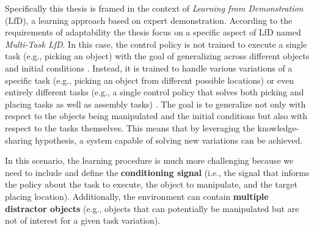 Specifically this thesis is framed in the context of \textit{Learning from Demonstration} (LfD), a learning approach based on expert demonstration. According to the requirements of adaptability the thesis focus on a specific aspect of LfD named \textit{Multi-Task LfD}. In this case, the control policy is not trained to execute a single task (e.g., picking an object) with the goal of generalizing across different objects and initial conditions \cite{zhang2018deep_vr_teleoperation,mandlekar2022matters}. Instead, it is trained to handle various variations of a specific task (e.g., picking an object from different possible locations) \cite{dasari2021transformers_one_shot} or even entirely different tasks (e.g., a single control policy that solves both picking and placing tasks as well as assembly tasks) \cite{brohan2022rt,mandi2022towards_more_generalizable_one_shot}. The goal is to generalize not only with respect to the objects being manipulated and the initial conditions but also with respect to the tasks themselves. This means that by leveraging the knowledge-sharing hypothesis, a system capable of solving new variations can be achieved.

In this scenario, the learning procedure is much more challenging because we need to include and define the \textbf{conditioning signal} (i.e., the signal that informs the policy about the task to execute, the object to manipulate, and the target placing location). Additionally, the environment can contain \textbf{multiple distractor objects} (e.g., objects that can potentially be manipulated but are not of interest for a given task variation). 

